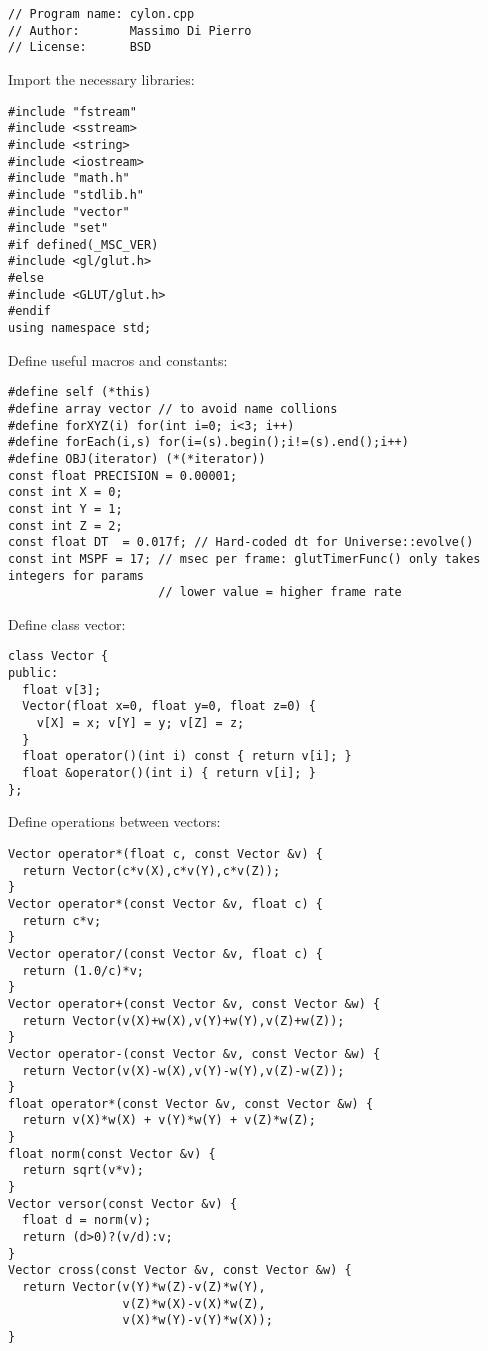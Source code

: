 \noindent
\begin{lstlisting}
// Program name: cylon.cpp
// Author:       Massimo Di Pierro
// License:      BSD
\end{lstlisting}
\noindent
Import the necessary libraries: \begin{lstlisting}
#include "fstream"
#include <sstream>
#include <string>
#include <iostream>
#include "math.h"
#include "stdlib.h"
#include "vector"
#include "set"
#if defined(_MSC_VER)
#include <gl/glut.h>
#else
#include <GLUT/glut.h>
#endif
using namespace std;
\end{lstlisting}
\noindent
Define useful macros and constants: \begin{lstlisting}
#define self (*this)
#define array vector // to avoid name collions
#define forXYZ(i) for(int i=0; i<3; i++)
#define forEach(i,s) for(i=(s).begin();i!=(s).end();i++)
#define OBJ(iterator) (*(*iterator))
const float PRECISION = 0.00001;
const int X = 0;
const int Y = 1;
const int Z = 2;
const float DT  = 0.017f; // Hard-coded dt for Universe::evolve()
const int MSPF = 17; // msec per frame: glutTimerFunc() only takes integers for params
                     // lower value = higher frame rate
\end{lstlisting}
\noindent
Define class vector: \begin{lstlisting}
class Vector {
public:
  float v[3];
  Vector(float x=0, float y=0, float z=0) {
    v[X] = x; v[Y] = y; v[Z] = z;
  }
  float operator()(int i) const { return v[i]; }
  float &operator()(int i) { return v[i]; }
};
\end{lstlisting}
\noindent
Define operations between vectors: \begin{lstlisting}
Vector operator*(float c, const Vector &v) {
  return Vector(c*v(X),c*v(Y),c*v(Z));
}
Vector operator*(const Vector &v, float c) {
  return c*v;
}
Vector operator/(const Vector &v, float c) {
  return (1.0/c)*v;
}
Vector operator+(const Vector &v, const Vector &w) {
  return Vector(v(X)+w(X),v(Y)+w(Y),v(Z)+w(Z));
}
Vector operator-(const Vector &v, const Vector &w) {
  return Vector(v(X)-w(X),v(Y)-w(Y),v(Z)-w(Z));
}
float operator*(const Vector &v, const Vector &w) {
  return v(X)*w(X) + v(Y)*w(Y) + v(Z)*w(Z);
}
float norm(const Vector &v) {
  return sqrt(v*v);
}
Vector versor(const Vector &v) {
  float d = norm(v);
  return (d>0)?(v/d):v;
}
Vector cross(const Vector &v, const Vector &w) {
  return Vector(v(Y)*w(Z)-v(Z)*w(Y),
                v(Z)*w(X)-v(X)*w(Z),
                v(X)*w(Y)-v(Y)*w(X));
}
\end{lstlisting}
